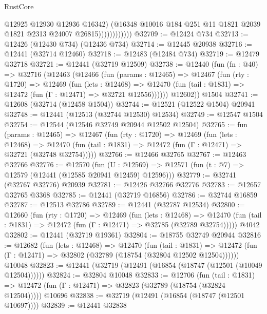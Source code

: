 \begin{lexlean}{RustCore}
\begin{coremodule}
                            @12925
                            @12930
                            @12936
                            @16342)
                          (@16348
                            @10016
                            @184
                            @251
                            @11
                            @1821
                            @2039
                            @1821
                            @2313
                            @24007
                            @26815))))))))))))
@32709 := @12424 @734
@32713 := @12426 (@12430 @734) (@12436 @734)
@32714 := @12445 @20938
@32716 := @12441 (@32714 @12460)
@32718 := @12483 (@12484 @734)
@32719 := @12479 @32718
@32721 := @12441 (@32719 @12509)
@32738 := @12440
    (fun (fn : @40) =>
    @32716
      (@12463
        (@12466
          (fun (params : @12465) =>
          @12467
            (fun (rty : @1720) =>
            @12469
              (fun (lets : @12468) =>
              @12470 (fun (tail : @1831) => @12472 (fun (Γ : @12471) => @32721 @12556))))))
        @12602))
    @1504
@32741 := @12608 (@32714 (@12458 @1504))
@32744 := @12521 (@12522 @1504) @20941
@32748 := @12441 (@12513 (@32744 @12530) @12534)
@32749 := @12547 @1504
@32754 := @12544 (@12546 @32749 @20944 @12502 @12504)
@32765 := fun (params : @12465) =>
  @12467
    (fun (rty : @1720) =>
    @12469
      (fun (lets : @12468) =>
      @12470 (fun (tail : @1831) => @12472 (fun (Γ : @12471) => @32721 (@32748 @32754)))))
@32766 := @12466 @32765
@32767 := @12463 @32766
@32776 := @12570
    (fun (U : @12569) => @12571 (fun (t : @7) => @12579 (@12441 (@12585 @20941 @12459) @12596)))
@32779 := @32741 (@32767 @32776) @20939
@32781 := @12426 @32766 @32776
@32783 := @12657 @32765 @3368
@32785 := @12441 (@32719 @16856)
@32786 := @32744 @16859
@32787 := @12513 @32786
@32789 := @12441 (@32787 @12534)
@32800 := @12660
    (fun (rty : @1720) =>
    @12469
      (fun (lets : @12468) =>
      @12470 (fun (tail : @1831) => @12472 (fun (Γ : @12471) => @32785 (@32789 @32754)))))
    @4042
@32802 := @12441 (@32719 @19361)
@32804 := @18755 @32749 @20944
@32816 := @12682
    (fun (lets : @12468) =>
    @12470
      (fun (tail : @1831) =>
      @12472 (fun (Γ : @12471) => @32802 (@32789 (@18754 (@32804 @12502 @12504))))))
    @10048
@32823 := @12441 (@32719 (@12491 (@16854 (@18747 (@12501 (@10049 @12504))))))
@32824 := @32804 @10048
@32833 := @12706
    (fun (tail : @1831) => @12472 (fun (Γ : @12471) => @32823 (@32789 (@18754 (@32824 @12504)))))
    @10696
@32838 := @32719 (@12491 (@16854 (@18747 (@12501 @10697))))
@32839 := @12441 @32838

\end{coremodule}
\end{lexlean}
